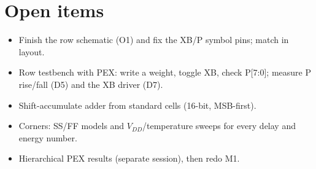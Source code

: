 \documentclass[11pt]{article}
\begin{document}
\section{Open items}
\begin{itemize}
  \item Finish the row schematic (O1) and fix the XB/P symbol pins; match in layout.
  \item Row testbench with PEX: write a weight, toggle XB, check P[7:0]; measure P rise/fall (D5) and the XB driver (D7).
  \item Shift-accumulate adder from standard cells (16-bit, MSB-first).
  \item Corners: SS/FF models and $V_{DD}$/temperature sweeps for every delay and energy number.
  \item Hierarchical PEX results (separate session), then redo M1.
\end{itemize}
\end{document}
